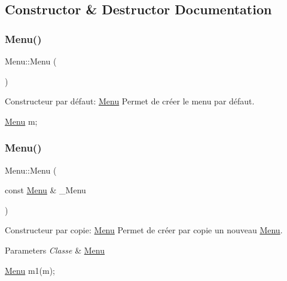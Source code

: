 \subsection{Constructor \& Destructor Documentation}
\mbox{\label{classMenu_ad466dd83355124a6ed958430450bfe94}} 
\subsubsection{\texorpdfstring{Menu()}{Menu()}\hspace{0.1cm}{\footnotesize\ttfamily [1/3]}}
{\footnotesize\ttfamily Menu\+::\+Menu (\begin{DoxyParamCaption}{ }\end{DoxyParamCaption})}



Constructeur par défaut\+: \hyperlink{classMenu}{Menu} Permet de créer le menu par défaut. 


\begin{DoxyCode}
\hyperlink{classMenu}{Menu} m;
\end{DoxyCode}
 \mbox{\label{classMenu_a255104f828234493ca62a43d144d2573}} 
\subsubsection{\texorpdfstring{Menu()}{Menu()}\hspace{0.1cm}{\footnotesize\ttfamily [2/3]}}
{\footnotesize\ttfamily Menu\+::\+Menu (\begin{DoxyParamCaption}\item[{const \hyperlink{classMenu}{Menu} \&}]{\+\_\+\+Menu }\end{DoxyParamCaption})}



Constructeur par copie\+: \hyperlink{classMenu}{Menu} Permet de créer par copie un nouveau \hyperlink{classMenu}{Menu}. 


\begin{DoxyParams}{Parameters}
{\em Classe} & \hyperlink{classMenu}{Menu} 
\begin{DoxyCode}
\hyperlink{classMenu}{Menu} m1(m);
\end{DoxyCode}
 \\
\hline
\end{DoxyParams}
\mbox{\label{classMenu_a51e725eafe16d272ea48c377a1d3aeff}} 
